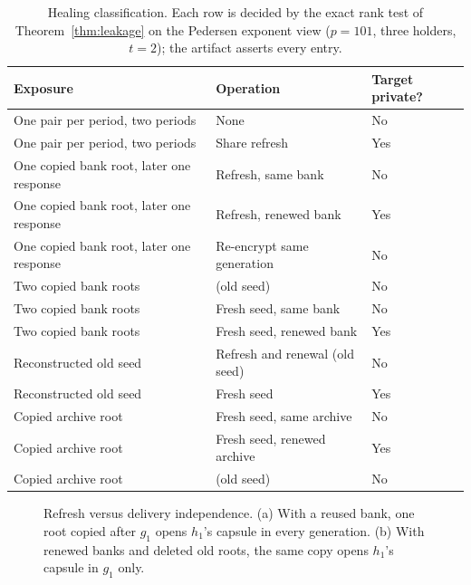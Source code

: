 \documentclass[pdflatex,sn-mathphys-num]{sn-jnl}%
\theoremstyle{plain}
\theoremstyle{definition}
\begin{document}
\begin{table}[t]
\caption{Healing classification. Each row is decided by the exact rank test of Theorem~\ref{thm:leakage} on the Pedersen exponent view ($p=101$, three holders, $t=2$); the artifact asserts every entry.}\label{tab:healing}
\centering\footnotesize
\begin{tabularx}{\linewidth}{@{}>{\raggedright\arraybackslash}p{.36\linewidth}>{\raggedright\arraybackslash}p{.33\linewidth}Y@{}}\toprule
Exposure & Operation & Target private?\\\midrule
One pair per period, two periods & None & No\\
One pair per period, two periods & Share refresh & Yes\\
One copied bank root, later one response & Refresh, same bank & No\\
One copied bank root, later one response & Refresh, renewed bank & Yes\\
One copied bank root, later one response & Re-encrypt same generation & No\\
Two copied bank roots & (old seed) & No\\
Two copied bank roots & Fresh seed, same bank & No\\
Two copied bank roots & Fresh seed, renewed bank & Yes\\
Reconstructed old seed & Refresh and renewal (old seed) & No\\
Reconstructed old seed & Fresh seed & Yes\\
Copied archive root & Fresh seed, same archive & No\\
Copied archive root & Fresh seed, renewed archive & Yes\\
Copied archive root & (old seed) & No\\\bottomrule
\end{tabularx}
\end{table}

\begin{figure}[t]
\centering
\figbox{}
\caption{Refresh versus delivery independence. (a) With a reused bank, one root copied after $g_1$ opens $h_1$'s capsule in every generation. (b) With renewed banks and deleted old roots, the same copy opens $h_1$'s capsule in $g_1$ only.}\label{fig:reuse}
\end{figure}
\end{document}
